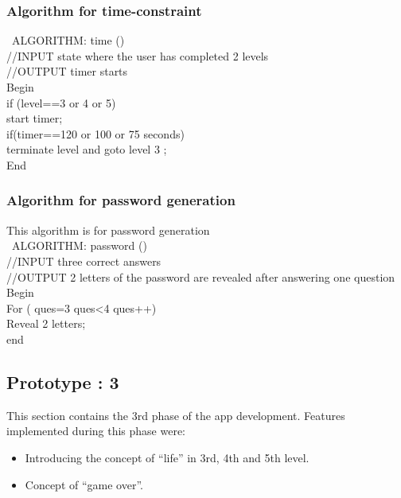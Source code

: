\subsubsection{Algorithm for time-constraint }
 \hspace{1cm}
\rmfamily\ ALGORITHM: time ()\\
//INPUT  state where the user has completed 2 levels\\
//OUTPUT timer starts\\

Begin\\
 if (level==3 or 4 or 5)\\
start timer;\\
if(timer==120 or 100 or 75 seconds)\\
terminate level and goto level 3 ;\\
End
\rmfamily
\subsubsection{Algorithm for  password generation }
\hspace{1cm}This algorithm is for password generation\\
\rmfamily\ 
ALGORITHM: password ()\\
//INPUT three correct answers\\
//OUTPUT 2 letters of the password are revealed after answering one question\\
Begin\\
For ( ques=3 ques<4 ques++)\\
Reveal 2 letters;\\
end
\rmfamily



\subsection{Prototype : 3}
\hspace{1cm}This section contains the 3rd phase of the app development. Features implemented during this phase were:\\
\begin{itemize}
\item \textbf {}Introducing the concept of “life” in 3rd, 4th and 5th level.
\item \textbf {}Concept of “game over”.
\end{itemize}


